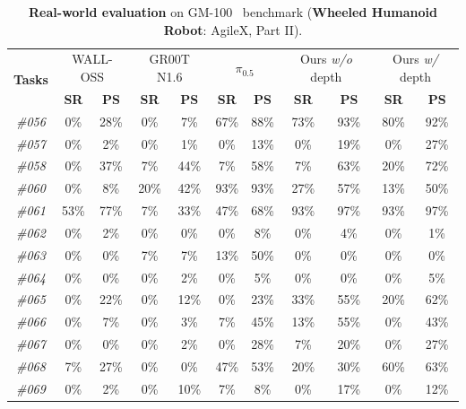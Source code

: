 \begin{table}[t]
  \centering
  \caption{\textbf{Real-world evaluation} on GM-100~\cite{gm100} benchmark (\textbf{Wheeled Humanoid Robot}: AgileX, Part II).}
  \small
  \setlength{\tabcolsep}{12pt}
    \begin{tabular}{ccccccccccc}
    \toprule
    \multirow{2}[2]{*}{\textbf{Tasks}} & \multicolumn{2}{c}{WALL-OSS} & \multicolumn{2}{c}{GR00T N1.6} & \multicolumn{2}{c}{$\pi_{0.5}$} & \multicolumn{2}{c}{Ours \textit{w/o} depth} & \multicolumn{2}{c}{Ours \textit{w/} depth} \\
          & \textbf{SR} & \textbf{PS} & \textbf{SR} & \textbf{PS} & \textbf{SR} & \textbf{PS} & \textbf{SR} & \textbf{PS} & \textbf{SR} & \textbf{PS} \\
    \midrule
\textit{\#056} & 0\%   & 28\%  & 0\%   & 7\%   & 67\%  & 88\%  & 73\%  & 93\%  & 80\%  & 92\% \\
    \textit{\#057} & 0\%   & 2\%   & 0\%   & 1\%   & 0\%   & 13\%  & 0\%   & 19\%  & 0\%   & 27\% \\
    \textit{\#058} & 0\%   & 37\%  & 7\%   & 44\%  & 7\%   & 58\%  & 7\%   & 63\%  & 20\%  & 72\% \\
    \textit{\#060} & 0\%   & 8\%   & 20\%  & 42\%  & 93\%  & 93\%  & 27\%  & 57\%  & 13\%  & 50\% \\
    \textit{\#061} & 53\%  & 77\%  & 7\%   & 33\%  & 47\%  & 68\%  & 93\%  & 97\%  & 93\%  & 97\% \\
    \textit{\#062} & 0\%   & 2\%   & 0\%   & 0\%   & 0\%   & 8\%   & 0\%   & 4\%   & 0\%   & 1\% \\
    \textit{\#063} & 0\%   & 0\%   & 7\%   & 7\%   & 13\%  & 50\%  & 0\%   & 0\%   & 0\%   & 0\% \\
    \textit{\#064} & 0\%   & 0\%   & 0\%   & 2\%   & 0\%   & 5\%   & 0\%   & 0\%   & 0\%   & 5\% \\
    \textit{\#065} & 0\%   & 22\%  & 0\%   & 12\%  & 0\%   & 23\%  & 33\%  & 55\%  & 20\%  & 62\% \\
    \textit{\#066} & 0\%   & 7\%   & 0\%   & 3\%   & 7\%   & 45\%  & 13\%  & 55\%  & 0\%   & 43\% \\
    \textit{\#067} & 0\%   & 0\%   & 0\%   & 2\%   & 0\%   & 28\%  & 7\%   & 20\%  & 0\%   & 27\% \\
    \textit{\#068} & 7\%   & 27\%  & 0\%   & 0\%   & 47\%  & 53\%  & 20\%  & 30\%  & 60\%  & 63\% \\
    \textit{\#069} & 0\%   & 2\%   & 0\%   & 10\%  & 7\%   & 8\%   & 0\%   & 17\%  & 0\%   & 12\% \\

\end{tabular}
\end{table}
